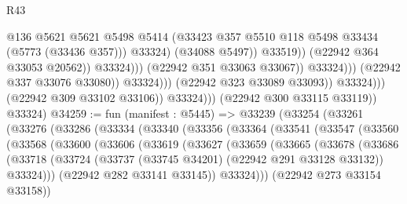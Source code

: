 \begin{lexlean}{R43}
\begin{coremodule}
                                                        @136
                                                        @5621
                                                        @5621
                                                        @5498
                                                        @5414
                                                        (@33423
                                                          @357
                                                          @5510
                                                          @118
                                                          @5498
                                                          @33434
                                                          (@5773 (@33436 @357)))
                                                        @33324)
                                                      (@34088 @5497))
                                                    @33519))
                                                (@22942 @364 @33053 @20562))
                                              @33324)))
                                        (@22942 @351 @33063 @33067))
                                      @33324)))
                                (@22942 @337 @33076 @33080))
                              @33324)))
                        (@22942 @323 @33089 @33093))
                      @33324)))
                (@22942 @309 @33102 @33106))
              @33324)))
        (@22942 @300 @33115 @33119))
      @33324)
@34259 := fun (manifest : @5445) =>
  @33239
    (@33254
      (@33261
        (@33276
          (@33286
            (@33334
              (@33340
                (@33356
                  (@33364
                    (@33541
                      (@33547
                        (@33560
                          (@33568
                            (@33600
                              (@33606
                                (@33619
                                  (@33627
                                    (@33659
                                      (@33665
                                        (@33678
                                          (@33686
                                            (@33718
                                              (@33724
                                                (@33737 (@33745 @34201) (@22942 @291 @33128 @33132))
                                                @33324)))
                                          (@22942 @282 @33141 @33145))
                                        @33324)))
                                  (@22942 @273 @33154 @33158))

\end{coremodule}
\end{lexlean}
